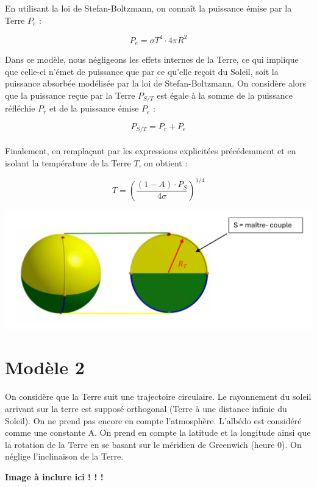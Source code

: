 \documentclass[a4paper,11pt]{article}
\begin{document}
En utilisant la loi de Stefan-Boltzmann, on connaît la puissance émise par la Terre $P_e$ :

\[ P_e = \sigma T^4 \cdot 4 \pi R^2 \]

Dans ce modèle, nous négligeons les effets internes de la Terre, ce qui implique que celle-ci n'émet de puissance que par ce qu'elle reçoit du Soleil, soit la puissance absorbée modélisée par la loi de Stefan-Boltzmann. On considère alors que la puissance reçue par la Terre $P_{S/T}$ est égale à la somme de la puissance réfléchie $P_r$ et de la puissance émise $P_e$ :

\[ P_{S/T} = P_r + P_e \] \\

Finalement, en remplaçant par les expressions explicitées précédemment et en isolant la température de la Terre $T$, on obtient :

\[ T = \left(\dfrac{(1 - A) \cdot P_S}{4\sigma}\right)^{1/4} \]

\begin{adjustbox}{center}
\includegraphics[scale=0.9]{Schema_maitre_couple}
\end{adjustbox}

\section{Modèle 2}

On considère que la Terre suit une trajectoire circulaire. Le rayonnement du soleil arrivant sur la terre est supposé orthogonal (Terre à une distance infinie du Soleil). On ne prend pas encore en compte l’atmosphère. L’albédo est considéré comme une constante A. On prend en compte la latitude et la longitude ainsi que la rotation de la Terre en se basant sur le méridien de Greenwich (heure 0). On néglige l'inclinaison de la Terre.

\textbf{Image à inclure ici ! ! !
}
\end{document}
